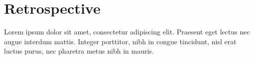 \chapter{Retrospective}
Lorem ipsum dolor sit amet, consectetur adipiscing elit. Praesent eget lectus
nec augue interdum mattis. Integer porttitor, nibh in congue tincidunt, nisl
erat luctus purus, nec pharetra metus nibh in mauris.
